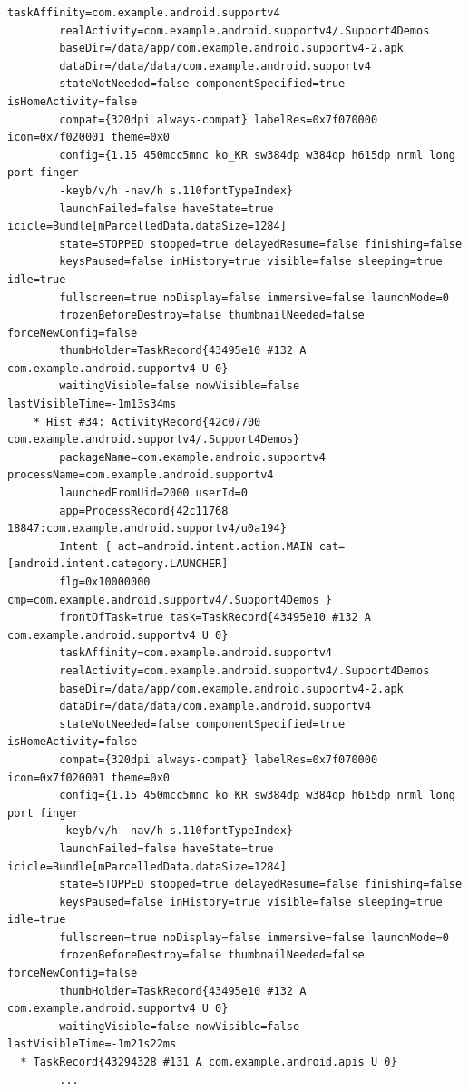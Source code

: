 \begin{lstlisting}[frame=single]
        taskAffinity=com.example.android.supportv4
        realActivity=com.example.android.supportv4/.Support4Demos
        baseDir=/data/app/com.example.android.supportv4-2.apk
        dataDir=/data/data/com.example.android.supportv4
        stateNotNeeded=false componentSpecified=true isHomeActivity=false
        compat={320dpi always-compat} labelRes=0x7f070000 icon=0x7f020001 theme=0x0
        config={1.15 450mcc5mnc ko_KR sw384dp w384dp h615dp nrml long port finger 
        -keyb/v/h -nav/h s.110fontTypeIndex}
        launchFailed=false haveState=true icicle=Bundle[mParcelledData.dataSize=1284]
        state=STOPPED stopped=true delayedResume=false finishing=false
        keysPaused=false inHistory=true visible=false sleeping=true idle=true
        fullscreen=true noDisplay=false immersive=false launchMode=0
        frozenBeforeDestroy=false thumbnailNeeded=false forceNewConfig=false
        thumbHolder=TaskRecord{43495e10 #132 A com.example.android.supportv4 U 0}
        waitingVisible=false nowVisible=false lastVisibleTime=-1m13s34ms
    * Hist #34: ActivityRecord{42c07700 com.example.android.supportv4/.Support4Demos}
        packageName=com.example.android.supportv4 processName=com.example.android.supportv4
        launchedFromUid=2000 userId=0
        app=ProcessRecord{42c11768 18847:com.example.android.supportv4/u0a194}
        Intent { act=android.intent.action.MAIN cat=[android.intent.category.LAUNCHER] 
        flg=0x10000000 cmp=com.example.android.supportv4/.Support4Demos }
        frontOfTask=true task=TaskRecord{43495e10 #132 A com.example.android.supportv4 U 0}
        taskAffinity=com.example.android.supportv4
        realActivity=com.example.android.supportv4/.Support4Demos
        baseDir=/data/app/com.example.android.supportv4-2.apk
        dataDir=/data/data/com.example.android.supportv4
        stateNotNeeded=false componentSpecified=true isHomeActivity=false
        compat={320dpi always-compat} labelRes=0x7f070000 icon=0x7f020001 theme=0x0
        config={1.15 450mcc5mnc ko_KR sw384dp w384dp h615dp nrml long port finger 
        -keyb/v/h -nav/h s.110fontTypeIndex}
        launchFailed=false haveState=true icicle=Bundle[mParcelledData.dataSize=1284]
        state=STOPPED stopped=true delayedResume=false finishing=false
        keysPaused=false inHistory=true visible=false sleeping=true idle=true
        fullscreen=true noDisplay=false immersive=false launchMode=0
        frozenBeforeDestroy=false thumbnailNeeded=false forceNewConfig=false
        thumbHolder=TaskRecord{43495e10 #132 A com.example.android.supportv4 U 0}
        waitingVisible=false nowVisible=false lastVisibleTime=-1m21s22ms
  * TaskRecord{43294328 #131 A com.example.android.apis U 0}
        ...
        

\end{lstlisting}
